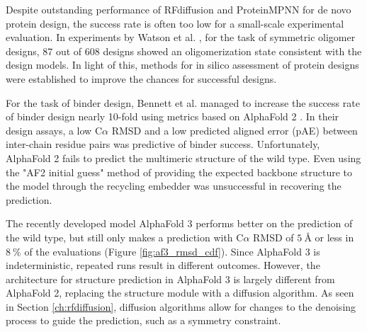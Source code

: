 % 



Despite outstanding performance of RFdiffusion and ProteinMPNN for de novo protein design, the success rate is often too low for a small-scale experimental evaluation. In experiments by Watson et al. \cite{RFdiffusion}, for the task of symmetric oligomer designs, 87 out of 608 designs showed an oligomerization state consistent with the design models. In light of this, methods for in silico assessment of protein designs were established to improve the chances for successful designs. 

For the task of binder design, Bennett et al. managed to increase the success rate of binder design nearly 10-fold using metrics based on AlphaFold 2 \cite{binder_design}. In their design assays, a low C$\alpha$ RMSD and a low predicted aligned error (pAE) between inter-chain residue pairs was predictive of binder success. Unfortunately, AlphaFold 2 fails to predict the multimeric structure of the wild type. Even using the "AF2 initial guess" method \cite{binder_design} of providing the expected backbone structure to the model through the recycling embedder was unsuccessful in recovering the prediction. 

The recently developed model AlphaFold 3 \cite{af3} performs better on the prediction of the wild type, but still only makes a prediction with C$\alpha$ RMSD of $\SI{5}{\angstrom}$ or less in $\SI{8}{\percent}$ of the evaluations (Figure \ref{fig:af3_rmsd_cdf}). Since AlphaFold 3 is indeterministic, repeated runs  result in different outcomes. However, the architecture for structure prediction in AlphaFold 3 is largely different from AlphaFold 2, replacing the structure module with a diffusion algorithm. As seen in Section \ref{ch:rfdiffusion}, diffusion algorithms allow for changes to the denoising process to guide the prediction, such as a symmetry constraint. 

